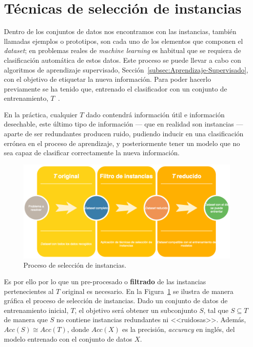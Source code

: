\section{Técnicas de selección de instancias}\label{sec:tecnicas-seleccion-instancias}
Dentro de los conjuntos de datos nos encontramos con las instancias, también llamadas ejemplos o prototipos, son cada uno de los elementos que componen el \textit{dataset}; en problemas reales de \textit{machine learning} es habitual que se requiera de clasificación automática de estos datos. Este proceso se puede llevar a cabo con algoritmos de aprendizaje supervisado, Sección~\ref{subsec:Aprendizaje-Supervisado}, con el objetivo de etiquetar la nueva información. Para poder hacerlo previamente se ha tenido que, entrenado el clasificador con un conjunto de entrenamiento, $T$~\cite{olvera2010review}.

En la práctica, cualquier $T$ dado contendrá información útil e información desechable, este último tipo de información --- que en realidad son instancias --- aparte de ser redundantes producen ruido, pudiendo inducir en una clasificación errónea en el proceso de aprendizaje, y posteriormente tener un modelo que no sea capaz de clasificar correctamente la nueva información.

\begin{figure}
\centering
\includegraphics[width=\linewidth]{../img/memoria/Instance-Selection-Overview}
\caption{Proceso de selección de instancias.}
\label{fig:instance-election-overview}
\end{figure}

Es por ello por lo que un pre-procesado o \textbf{filtrado} de las instancias pertenecientes al $T$ original es necesario. En la Figura~\ref{fig:instance-election-overview} se ilustra de manera gráfica el proceso de selección de instancias. Dado un conjunto de datos de entrenamiento inicial, $T$, el objetivo será obtener un subconjunto $S$, tal que $S \subseteq T$ de manera que $S$ no contiene instancias redundantes ni <<ruidosas>>. Además, $Acc(S) \cong Acc(T)$, donde $Acc(X)$ es la precisión, \textit{accuracy} en inglés, del modelo entrenado con el conjunto de datos $X$.

